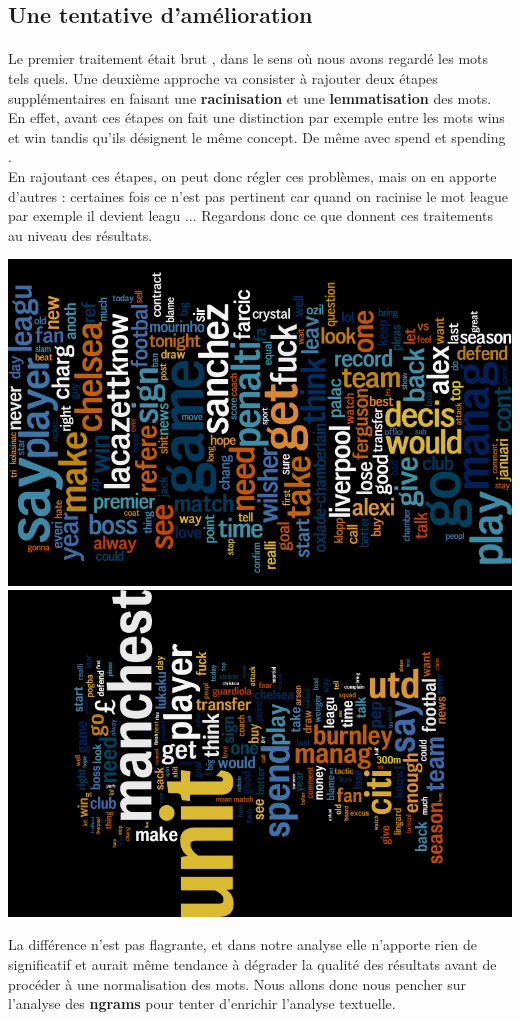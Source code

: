 \documentclass[14pt, openany]{article}
\begin{document}
\subsection{Une tentative d'amélioration}
\paragraph{}
Le premier traitement était \og brut \fg{}, dans le sens où nous avons regardé les mots tels quels. Une deuxième approche va consister à rajouter deux étapes supplémentaires en faisant une \textbf{racinisation} et une \textbf{lemmatisation} des mots. En effet, avant ces étapes on fait une distinction par exemple entre les mots \og wins \fg{} et \og win \fg{} tandis qu'ils désignent le même concept. De même avec \og spend \fg{} et \og spending \fg{}.\\
En rajoutant ces étapes, on peut donc régler ces problèmes, mais on en apporte d'autres : certaines fois ce n'est pas pertinent car quand on racinise le mot \og league \fg{} par exemple il devient \og leagu \fg{}... Regardons donc ce que donnent ces traitements au niveau des résultats.
\begin{center}
\includegraphics[scale=0.6]{Images/wenger_stems.png}
\medskip
\includegraphics[scale=0.6]{Images/mourinho_stems.png}
\end{center}
La différence n'est pas flagrante, et dans notre analyse elle n'apporte rien de significatif et aurait même tendance à dégrader la qualité des résultats avant de procéder à une normalisation des mots. Nous allons donc nous pencher sur l'analyse des \textbf{ngrams} pour tenter d'enrichir l'analyse textuelle.
\end{document}
